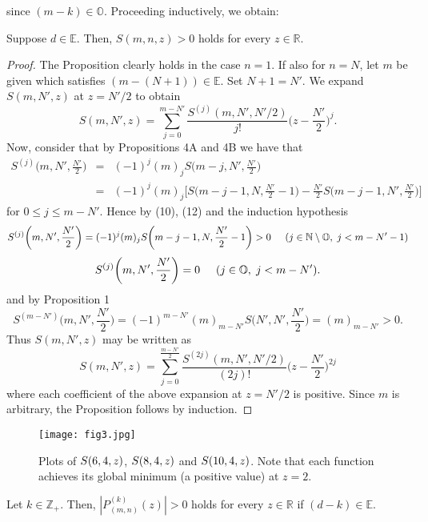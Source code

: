 \documentclass[]{amsart}
\begin{document}
since $(m-k) \in \mathbb{O}$.  Proceeding inductively, we obtain:
\begin{prop}
Suppose $d \in \mathbb{E}$. Then, $S(m,n,z) > 0$ holds for every $z \in \mathbb{R}$.
\end{prop}
\begin{proof}
The Proposition clearly holds in the case $n = 1$.  If also for $n = N$, let $m$ be given which satisfies $(m-(N+1)) \in \mathbb{E}$.  Set $N+1 = N'$.  We expand $S(m,N',z)$ at $z = N'/2$ to obtain
\begin{equation}
S(m,N',z) = \sum_{j=0}^{m-N'}\frac{S^{(j)}(m,N',N'/2)}{j!}\bigg(z - \frac{N'}{2}\bigg)^{j}.
\end{equation}
Now, consider that by Propositions 4A and 4B we have that
\begin{eqnarray}
S^{(j)}\bigg(m,N',\frac{N'}{2}\bigg) & = & (-1)^{j}(m)_{j}S\bigg(m-j,N',\frac{N'}{2}\bigg) \nonumber \\
									 & = & (-1)^{j}(m)_{j}\bigg[S\bigg(m-j-1,N,\frac{N'}{2}-1\bigg) - \frac{N'}{2}S\bigg(m-j-1,N',\frac{N'}{2}\bigg)\bigg]
\end{eqnarray}
for $0 \leq j \leq m-N'.$  Hence by (10), (12) and the induction hypothesis
\[ S^{(j)}\bigg(m,N',\frac{N'}{2}\bigg) = (-1)^{j}(m)_{j}S\bigg(m-j-1,N,\frac{N'}{2}-1\bigg) > 0   \hspace{5mm} (j \in \mathbb{N}\setminus\mathbb{O}, \hspace{1mm} j < m-N'-1) \]
\[ S^{(j)}\bigg(m,N',\frac{N'}{2}\bigg) = 0 \hspace{5mm} (j \in \mathbb{O},\hspace{1mm} j < m-N'). \]
and by Proposition 1
\[ S^{(m-N')}\bigg(m,N',\frac{N'}{2}\bigg) = (-1)^{m-N'}(m)_{m-N'}S\bigg(N',N',\frac{N'}{2}\bigg) = (m)_{m-N'} > 0. \]
Thus $S(m,N',z)$ may be written as
\[ S(m,N',z) = \sum_{j=0}^{\frac{m-N'}{2}}\frac{S^{(2j)}(m,N',N'/2)}{(2j)!}\bigg(z - \frac{N'}{2}\bigg)^{2j} \]
where each coefficient of the above expansion at $z = N'/2$ is positive.  Since $m$ is arbitrary, the Proposition follows by induction.
\end{proof}
\begin{figure}[h]
	\centering
	\texttt{[image: fig3.jpg]}
	\caption{Plots of $\protect S(6,4,z)$, $\protect S(8,4,z)$ and $\protect S(10,4,z)$.  Note that each function achieves its global minimum (a positive value) at $z = 2$.}
\end{figure}
\begin{cor}
Let $k \in \mathbb{Z}_{+}$.  Then, $|P^{(k)}_{(m,n)}(z)| > 0$ holds for every $z \in \mathbb{R}$ if $(d-k) \in \mathbb{E}$.
\end{cor}
\end{document}
